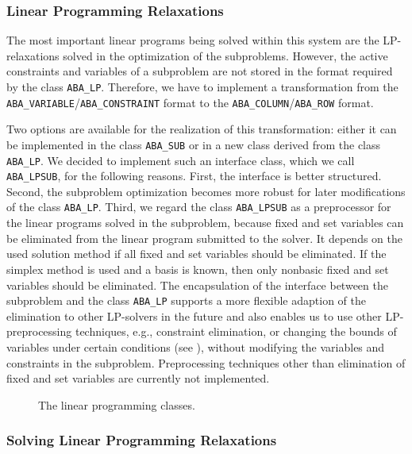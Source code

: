 \subsubsection{Linear Programming Relaxations}

The most important linear programs being solved within this system
are the LP-relaxations solved in the optimization of the subproblems.
However, the active constraints and variables of a subproblem
are not stored in the format required by the class {\tt ABA\_LP}.
Therefore, we have to implement a transformation from the 
{\tt ABA\_VARIABLE}/{\tt ABA\_CONSTRAINT} format to the
{\tt ABA\_COLUMN}/{\tt ABA\_ROW} format.

Two options are available for the realization of this transformation:
either it can be implemented in the class {\tt ABA\_SUB} or in a new
class derived from the class {\tt ABA\_LP}. We decided to implement
such an interface class, which we call
{{\tt ABA\_LPSUB}}, 
for the following
reasons. First, the interface is better structured. Second, 
the subproblem optimization becomes more robust for later
modifications of the class {\tt ABA\_LP}. Third, we regard the class
{\tt ABA\_LPSUB} as a preprocessor for the linear programs solved in the
subproblem, because fixed and set variables can be eliminated
from the linear program submitted to the solver. It depends on the
used solution method if all fixed and set variables should be 
eliminated. If the simplex method is used and a basis is known,
then only nonbasic fixed and set variables should be eliminated.
The encapsulation of the interface between the subproblem and 
the class {\tt ABA\_LP} supports a more flexible adaption of the
elimination to other LP-solvers in the future and also enables
us to use other LP-preprocessing techniques, e.g., constraint
elimination, or changing the bounds of variables under certain
conditions (see \cite{Sav94}), without modifying the variables and 
constraints in the subproblem. Preprocessing techniques other
than elimination of fixed and set variables are currently not
implemented.

\begin{figure}
\centerline{
}
\caption{The linear programming classes.}
\label{figure:lp}
\end{figure}

\subsubsection{Solving Linear Programming Relaxations}

